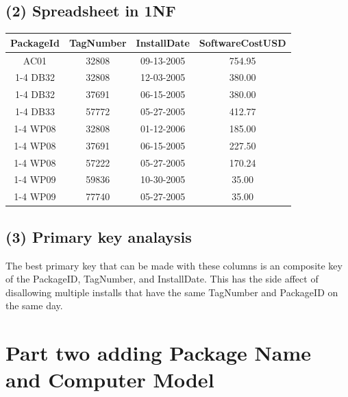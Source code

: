 \documentclass[letterpaper, 10pt]{article}
\begin{document}
\subsection{(2) Spreadsheet in 1NF}
\begin{table}[h]
\centering
\begin{tabular}{|c|c|c|c|}
\hline
PackageId & TagNumber & InstallDate & SoftwareCostUSD \\
\hline
AC01 & 32808 & 09-13-2005 & 754.95 \\
\cline{1-4}
DB32 & 32808 & 12-03-2005 & 380.00 \\
\cline{1-4}
DB32 & 37691 & 06-15-2005 & 380.00 \\
\cline{1-4}
DB33 & 57772 & 05-27-2005 & 412.77 \\
\cline{1-4}
WP08 & 32808 & 01-12-2006 & 185.00 \\
\cline{1-4}
WP08 & 37691 & 06-15-2005 & 227.50 \\
\cline{1-4}
WP08 & 57222 & 05-27-2005 & 170.24 \\
\cline{1-4}
WP09 & 59836 & 10-30-2005 & 35.00 \\
\cline{1-4}
WP09 & 77740 & 05-27-2005 & 35.00 \\
\hline
\end{tabular}
\end{table}
\subsection{(3) Primary key analaysis}
The best primary key that can be made with these columns
    is an composite key of the PackageID, TagNumber, 
    and InstallDate.
This has the side affect of disallowing multiple installs
    that have the same TagNumber and PackageID on the same day.
\section{Part two adding Package Name and Computer Model}
\end{document}
